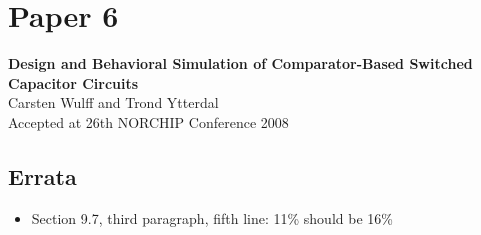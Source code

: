 \chapter{Paper 6}\label{sc:p6}
\textbf{\Large Design and Behavioral Simulation of Comparator-Based Switched
  Capacitor Circuits}\\
\indent Carsten Wulff and Trond Ytterdal\\
\indent Accepted at 26th NORCHIP Conference 2008\\
\renewcommand\myfigname{cdesfig:}
\renewcommand\myeqname{cdeseq:}

\section*{Errata}
\begin{itemize}
\item Section 9.7, third paragraph, fifth line: 11\% should be 16\%
\end{itemize}


